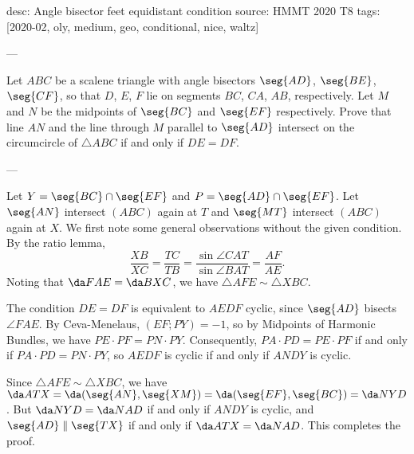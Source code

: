 desc: Angle bisector feet equidistant condition
source: HMMT 2020 T8
tags: [2020-02, oly, medium, geo, conditional, nice, waltz]

---

Let $ABC$ be a scalene triangle with angle bisectors $\seg{AD}$, $\seg{BE}$, $\seg{CF}$, so that $D$, $E$, $F$ lie on segments $BC$, $CA$, $AB$, respectively. Let $M$ and $N$ be the midpoints of $\seg{BC}$ and $\seg{EF}$ respectively. Prove that line $AN$ and the line through $M$ parallel to $\seg{AD}$ intersect on the circumcircle of $\triangle ABC$ if and only if $DE=DF$.

---

Let $Y=\seg{BC}\cap\seg{EF}$ and $P=\seg{AD}\cap\seg{EF}$. Let $\seg{AN}$ intersect $(ABC)$ again at $T$ and $\seg{MT}$ intersect $(ABC)$ again at $X$. We first note some general observations without the given condition. By the ratio lemma, \[\frac{XB}{XC}=\frac{TC}{TB}=\frac{\sin\angle CAT}{\sin\angle BAT}=\frac{AF}{AE}.\]
Noting that $\da FAE=\da BXC$, we have $\triangle AFE\sim\triangle XBC$.

The condition $DE=DF$ is equivalent to $AEDF$ cyclic, since $\seg{AD}$ bisects $\angle FAE$. By Ceva-Menelaus, $(EF;PY)=-1$, so by Midpoints of Harmonic Bundles, we have $PE\cdot PF=PN\cdot PY$. Consequently, $PA\cdot PD=PE\cdot PF$ if and only if $PA\cdot PD=PN\cdot PY$, so $AEDF$ is cyclic if and only if $ANDY$ is cyclic.

Since $\triangle AFE\sim\triangle XBC$, we have $\da ATX=\da(\seg{AN},\seg{XM})=\da(\seg{EF},\seg{BC})=\da NYD$. But $\da NYD=\da NAD$ if and only if $ANDY$ is cyclic, and $\seg{AD}\parallel\seg{TX}$ if and only if $\da ATX=\da NAD$. This completes the proof.
